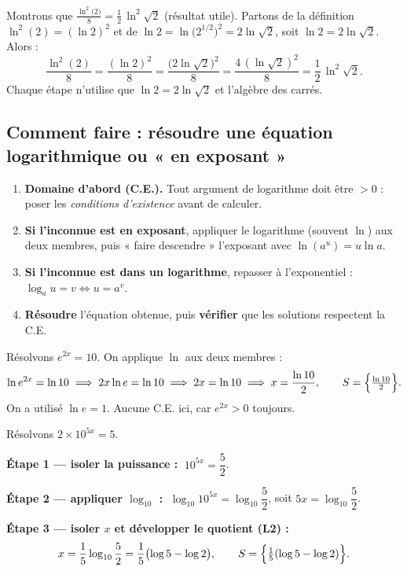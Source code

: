 \documentclass[11pt,a4paper]{article}
\begin{document}
\begin{exemple}
Montrons que $\displaystyle \frac{\ln^{2}\!\bigl(2\bigr)}{8}=\frac{1}{2}\,\ln^{2}\!\sqrt{2}$ (résultat utile).
Partons de la définition $\ln^2(2)=(\ln 2)^2$ et de $\ln 2 = \ln\bigl(2^{1/2}\bigr)^{2}=2\ln\sqrt2$, soit
$\ln 2 = 2\ln\sqrt 2$. Alors :
\[ \frac{\ln^{2}(2)}{8}=\frac{(\ln 2)^{2}}{8}
   =\frac{\bigl(2\ln\sqrt2\bigr)^{2}}{8}
   =\frac{4\,(\ln\sqrt2)^{2}}{8}
   =\frac{1}{2}\,\ln^{2}\sqrt2. \]
Chaque étape n'utilise que $\ln 2 = 2\ln\sqrt2$ et l'algèbre des carrés.
\end{exemple}

\subsection{Comment faire : résoudre une équation logarithmique ou « en exposant »}

\begin{commentfaire}
\begin{enumerate}[leftmargin=2em,topsep=2pt,itemsep=2pt]
  \item \textbf{Domaine d'abord (C.E.).} Tout argument de logarithme doit être $>0$ : poser les
        \emph{conditions d'existence} avant de calculer.
  \item \textbf{Si l'inconnue est en exposant}, appliquer le logarithme (souvent $\ln$) aux deux membres,
        puis « faire descendre » l'exposant avec $\ln(a^{u})=u\ln a$.
  \item \textbf{Si l'inconnue est dans un logarithme}, repasser à l'exponentiel : $\log_a u = v\Leftrightarrow u=a^{v}$.
  \item \textbf{Résoudre} l'équation obtenue, puis \textbf{vérifier} que les solutions respectent la C.E.
\end{enumerate}
\end{commentfaire}

\begin{exemple}
Résolvons $e^{2x}=10$. On applique $\ln$ aux deux membres :
\[ \ln e^{2x}=\ln 10 \;\Longrightarrow\; 2x\ln e=\ln 10 \;\Longrightarrow\; 2x=\ln 10
   \;\Longrightarrow\; x=\frac{\ln 10}{2}, \qquad S=\Bigl\{\tfrac{\ln 10}{2}\Bigr\}. \]
On a utilisé $\ln e=1$. Aucune C.E. ici, car $e^{2x}>0$ toujours.
\end{exemple}

\begin{exemple}
Résolvons $2\times 10^{5x}=5$.

\textbf{Étape 1 — isoler la puissance :} $\;10^{5x}=\dfrac{5}{2}$.

\textbf{Étape 2 — appliquer $\log_{10}$ :} $\;\log_{10}10^{5x}=\log_{10}\dfrac{5}{2}$, soit $5x=\log_{10}\dfrac52$.

\textbf{Étape 3 — isoler $x$ et développer le quotient (L2) :}
\[ x=\frac{1}{5}\log_{10}\frac{5}{2}=\frac{1}{5}\bigl(\log 5-\log 2\bigr),\qquad
   S=\Bigl\{\tfrac{1}{5}(\log 5-\log 2)\Bigr\}. \]
\end{exemple}
\end{document}
